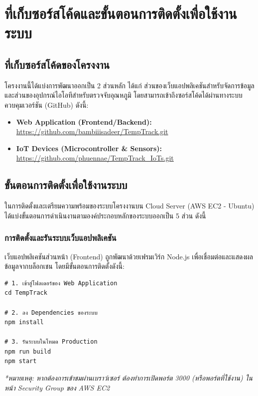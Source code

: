\chapter{ที่เก็บซอร์สโค้ดและขั้นตอนการติดตั้งเพื่อใช้งานระบบ}

\section{ที่เก็บซอร์สโค้ดของโครงงาน}
โครงงานนี้ได้แบ่งการพัฒนาออกเป็น 2 ส่วนหลัก ได้แก่ ส่วนของเว็บแอปพลิเคชันสำหรับจัดการข้อมูล และส่วนของอุปกรณ์ไอโอทีสำหรับตรวจจับอุณหภูมิ โดยสามารถเข้าถึงซอร์สโค้ดได้ผ่านทางระบบควบคุมเวอร์ชัน (GitHub) ดังนี้:

\begin{itemize}
    \item \textbf{Web Application (Frontend/Backend):} \\
    \url{https://github.com/bambiiisadeer/TempTrack.git}
    \item \textbf{IoT Devices (Microcontroller \& Sensors):} \\
    \url{https://github.com/phuennae/TempTrack_IoTs.git}
\end{itemize}

\section{ขั้นตอนการติดตั้งเพื่อใช้งานระบบ}
ในการติดตั้งและเตรียมความพร้อมของระบบโครงงานบน Cloud Server (AWS EC2 - Ubuntu) ได้แบ่งขั้นตอนการดำเนินงานตามองค์ประกอบหลักของระบบออกเป็น 5 ส่วน ดังนี้

\subsection{การติดตั้งและรันระบบเว็บแอปพลิเคชัน}
เว็บแอปพลิเคชันส่วนหน้า (Frontend) ถูกพัฒนาด้วยเฟรมเวิร์ก Node.js เพื่อเชื่อมต่อและแสดงผลข้อมูลจากบล็อกเชน โดยมีขั้นตอนการติดตั้งดังนี้:

\begin{verbatim}
# 1. เข้าสู่โฟลเดอร์ของ Web Application
cd TempTrack

# 2. ลง Dependencies ของระบบ
npm install

# 3. รันระบบในโหมด Production
npm run build
npm start
\end{verbatim}
\textit{*หมายเหตุ: หากต้องการเข้าชมผ่านเบราว์เซอร์ ต้องทำการเปิดพอร์ต 3000 (หรือพอร์ตที่ใช้งาน) ในหน้า Security Group ของ AWS EC2}

